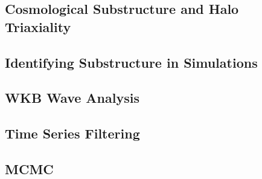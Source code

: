 \subsection{Cosmological Substructure and Halo Triaxiality}
\subsection{Identifying Substructure in Simulations}
\subsection{WKB Wave Analysis}
\subsection{Time Series Filtering}
\subsection{MCMC}




